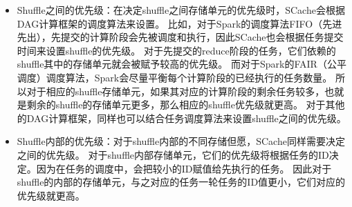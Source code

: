 \begin{itemize}
	\item Shuffle之间的优先级：在决定shuffle之间存储单元的优先级时，SCache会根据DAG计算框架的调度算法来设置。
	比如，对于Spark的调度算法FIFO（先进先出），先提交的计算阶段会先被调度和执行，因此SCache也会根据任务提交时间来设置shuffle的优先级。
	对于先提交的reduce阶段的任务，它们依赖的shuffle其中的存储单元就会被赋予较高的优先级。
	而对于Spark的FAIR（公平调度）调度算法，Spark会尽量平衡每个计算阶段的已经执行的任务数量。
	所以对于相应的shuffle存储单元，如果其对应的计算阶段的剩余任务较多，也就是剩余的shuffle的存储单元更多，那么相应的shuffle优先级就更高。
	对于其他的DAG计算框架，同样也可以结合任务调度算法来设置shuffle之间的优先级。
	\item Shuffle内部的优先级：对于shuffle内部的不同存储但愿，SCache同样需要决定之间的优先级。
	对于shuffle内部存储单元，它们的优先级将根据任务的ID决定。因为在任务的调度中，会把较小的ID赋值给先执行的任务。
	因此对于shuffle的内部的存储单元，与之对应的任务一轮任务的ID值更小，它们对应的优先级就更高。
\end{itemize}




